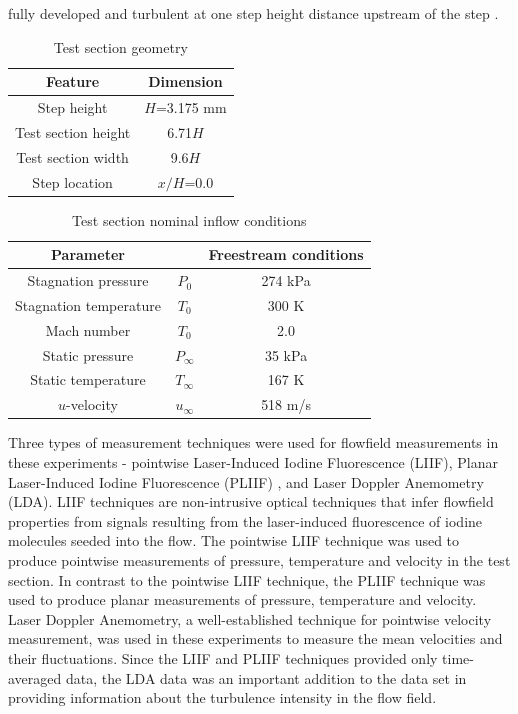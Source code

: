 fully developed and turbulent at one step height distance upstream of 
the step \cite{McDaniel1991}. 
%
\begin{table}[h]
  \caption{Test section geometry}
  \label{backward-facing-step-test-section-dims}
  \begin{center}
    \begin{tabular}{cc}
      \hline\hline
      Feature & Dimension \\
      \hline
      Step height         & $H$=3.175 mm \\
      Test section height & 6.71$H$  \\
      Test section width  & 9.6$H$   \\
      Step location       & $x/H$=0.0 \\
      \hline \hline
    \end{tabular}
  \end{center}
\end{table}
%
\begin{table}[h]
  \caption{Test section nominal inflow conditions}
  \label{backward-facing-step-inflow-conditions}
  \begin{center}
    \begin{tabular}{ccc}
      \hline\hline
      Parameter & & Freestream conditions \\
      \hline
      Stagnation pressure    & $P_0$      & 274 kPa \\     
      Stagnation temperature & $T_0$      & 300 K   \\   
      Mach number            & $T_0$      & 2.0     \\
      Static pressure        & $P_\infty$ & 35 kPa  \\  
      Static temperature     & $T_\infty$ & 167 K   \\
      $u$-velocity           & $u_\infty$ & 518 m/s \\
      \hline \hline
    \end{tabular}
  \end{center}
\end{table}
Three types of measurement techniques were used for flowfield measurements
in these experiments - pointwise Laser-Induced Iodine Fluorescence (LIIF),
Planar Laser-Induced Iodine Fluorescence (PLIIF) \cite{McDaniel1991, McDaniel1993} 
, and Laser Doppler Anemometry (LDA). LIIF 
techniques are non-intrusive optical techniques that infer flowfield
properties from signals resulting from the laser-induced fluorescence of
iodine molecules seeded into the flow. The pointwise LIIF technique was 
used to produce pointwise measurements of pressure, temperature and velocity
in the test section. In contrast to the pointwise LIIF technique, the PLIIF 
technique was used to produce planar measurements of pressure, temperature and 
velocity. Laser Doppler Anemometry, a well-established technique for pointwise
velocity measurement, was used in these experiments to measure the mean velocities 
and their fluctuations. Since the LIIF and PLIIF techniques provided only 
time-averaged data, the LDA data was an important addition to the data set in 
providing information about the turbulence intensity in the flow field.

